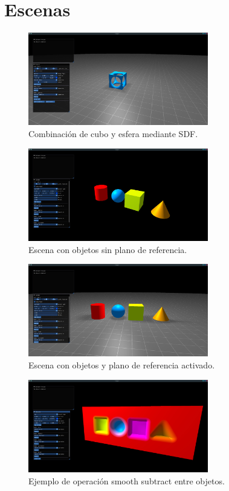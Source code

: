 \chapter{Escenas}

\begin{figure}[H]
	\centering
	\includegraphics[width=0.7\textwidth]{imagenes/Cubo_esfera.jpg}
	\caption{Combinación de cubo y esfera mediante SDF.}
\end{figure}

\begin{figure}[H]
	\centering
	\includegraphics[width=0.7\textwidth]{imagenes/objetos_sin_suelo.jpg}
	\caption{Escena con objetos sin plano de referencia.}
\end{figure}

\begin{figure}[H]
	\centering
	\includegraphics[width=0.7\textwidth]{imagenes/objetos_suelo.jpg}
	\caption{Escena con objetos y plano de referencia activado.}
\end{figure}

\begin{figure}[H]
	\centering
	\includegraphics[width=0.7\textwidth]{imagenes/smooth_substract.jpg}
	\caption{Ejemplo de operación smooth subtract entre objetos.}
\end{figure}

